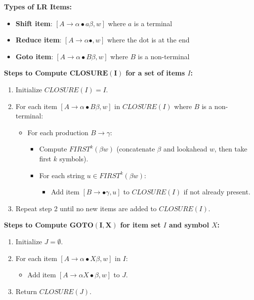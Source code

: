 \textbf{Types of LR Items:}
\begin{itemize}
    \item \textbf{Shift item}: $[A \to \alpha \bullet a \beta, w]$ where $a$ is a terminal
    \item \textbf{Reduce item}: $[A \to \alpha \bullet, w]$ where the dot is at the end
    \item \textbf{Goto item}: $[A \to \alpha \bullet B \beta, w]$ where $B$ is a non-terminal
\end{itemize}

\textbf{Steps to Compute $\mathbf{CLOSURE(I)}$ for a set of items $I$:}
\begin{enumerate}
    \item Initialize $CLOSURE(I) = I$.
    
    \item For each item $[A \to \alpha \bullet B \beta, w]$ in $CLOSURE(I)$ where $B$ is a non-terminal:
    \begin{itemize}
        \item For each production $B \to \gamma$:
        \begin{itemize}
            \item Compute $FIRST^k(\beta w)$ (concatenate $\beta$ and lookahead $w$, then take first $k$ symbols).
            \item For each string $u \in FIRST^k(\beta w)$:
            \begin{itemize}
                \item Add item $[B \to \bullet \gamma, u]$ to $CLOSURE(I)$ if not already present.
            \end{itemize}
        \end{itemize}
    \end{itemize}
    
    \item Repeat step 2 until no new items are added to $CLOSURE(I)$.
\end{enumerate}

\textbf{Steps to Compute $\mathbf{GOTO(I, X)}$ for item set $I$ and symbol $X$:}
\begin{enumerate}
    \item Initialize $J = \emptyset$.
    
    \item For each item $[A \to \alpha \bullet X \beta, w]$ in $I$:
    \begin{itemize}
        \item Add item $[A \to \alpha X \bullet \beta, w]$ to $J$.
    \end{itemize}
    
    \item Return $CLOSURE(J)$.
\end{enumerate}

